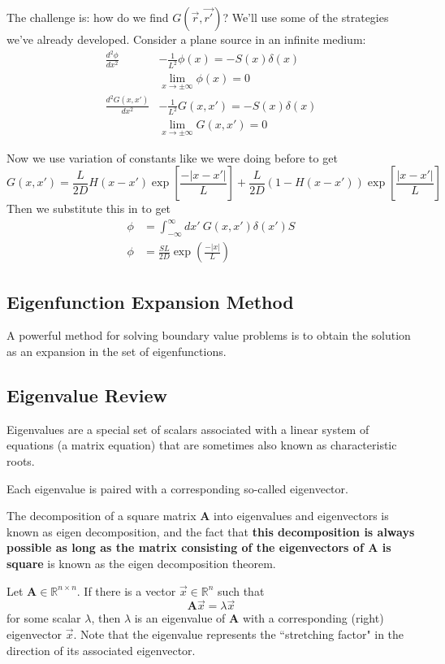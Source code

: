 \documentclass[12pt]{article}
\newcommand{\ve}[1]{\ensuremath{\mathbf{#1}}}
\begin{document}
The challenge is: how do we find $G(\vec{r}, \vec{r'})$? We'll use some of the strategies we've already developed. Consider a plane source in an infinite medium:
\begin{align*}
\frac{d^2\phi}{dx^2} &- \frac{1}{L^2}\phi(x) = -S(x)\delta(x)\\
&\lim_{x \rightarrow \pm \infty} \phi(x) = 0\\
%
\frac{d^2 G(x,x')}{dx^2} &- \frac{1}{L^2}G(x,x') = -S(x)\delta(x)\\
&\lim_{x \rightarrow \pm \infty} G(x,x') = 0
\end{align*}

Now we use variation of constants like we were doing before to get
\[
G(x,x') = \frac{L}{2D} H(x-x') \exp[\frac{-|x-x'|}{L}] +  \frac{L}{2D}(1- H(x-x')) \exp[\frac{|x-x'|}{L}]\]
Then we substitute this in to get
\begin{align*}
\phi &= \int_{-\infty}^{\infty} dx'\: G(x,x')\delta(x') S\\
\phi &= \frac{SL}{2D} \exp(\frac{-|x|}{L})
\end{align*}

\subsection*{Eigenfunction Expansion Method}
A powerful method for solving boundary value problems is to obtain the solution as an expansion in the set of eigenfunctions. 

\subsection*{Eigenvalue Review}

Eigenvalues are a special set of scalars associated with a linear system of equations (a matrix equation) that are sometimes also known as characteristic roots. 

Each eigenvalue is paired with a corresponding so-called eigenvector.

The decomposition of a square matrix $\ve{A}$ into eigenvalues and eigenvectors is known as eigen decomposition, and the fact that \textbf{this decomposition is always possible as long as the matrix consisting of the eigenvectors of $\ve{A}$ is square} is known as the eigen decomposition theorem.

Let $\ve{A} \in \mathbb{R}^{n \times n}$. If there is a vector $\vec{x} \in \mathbb{R}^{n}$ such that
%
\[\ve{A} \vec{x} = \lambda \vec{x}\]
%
for some scalar $\lambda$, then $\lambda$ is an eigenvalue of $\ve{A}$ with a corresponding (right) eigenvector $\vec{x}$. Note that the eigenvalue represents the ``stretching factor" in the direction of its associated eigenvector. 
\end{document}
